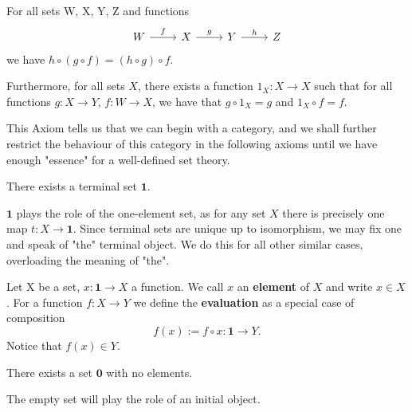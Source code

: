 \begin{axiom}
For all sets W, X, Y, Z and functions
\begin{equation*}
\begin{tikzcd}
W \arrow[r,"f"] & X \arrow[r,"g"] & Y \arrow[r,"h"] & Z 
\end{tikzcd}
\end{equation*}
we have $h \circ (g \circ f) = (h \circ g) \circ f$. 

Furthermore, for all sets $X$, there exists a function $1_{X}: X \longrightarrow X$ such that for all functions $g: X \longrightarrow Y$, $f: W \longrightarrow X$, we have that $g \circ 1_{X} = g$ and $1_{X} \circ f = f$.
\end{axiom}

\begin{remark}
This Axiom tells us that we can begin with a category, and we shall further restrict the behaviour of this category in the following axioms until we have enough "essence" for a well-defined set theory.
\end{remark}

\begin{axiom}[Elements]
There exists a terminal set $\mathbf{1}$.
\end{axiom}

\begin{remark}
$\mathbf{1}$ plays the role of the one-element set, as for any set $X$ there is precisely one map $t: X \longrightarrow \mathbf{1}$. Since terminal sets are unique up to isomorphism, we may fix one and speak of "the" terminal object. We do this for all other similar cases, overloading the meaning of "the".
\end{remark}

\begin{definition}
Let X be a set, $x: \mathbf{1} \longrightarrow X$ a function. We call $x$ an \textbf{element} of $X$ and write $x \in X$. For a function $f:X \longrightarrow Y$ we define the \textbf{evaluation} as a special case of composition 
\begin{equation*}
f(x) := f \circ x: \mathbf{1} \longrightarrow Y.
\end{equation*}
Notice that $f(x) \in Y$.
\end{definition}

\begin{axiom}
There exists a set $\mathbf{0}$ with no elements.
\end{axiom}

\begin{remark}
The empty set will play the role of an initial object.
\end{remark}

